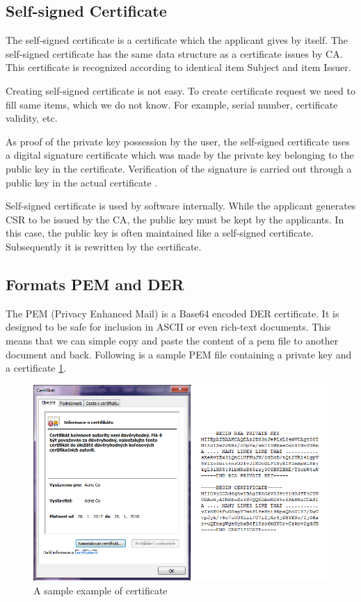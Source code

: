 \documentclass[
  digital, %
  notable,   %
  lof,     %
  lot,     %
]{fithesis3}
\begin{document}
\subsection{Self-signed Certificate}
The self-signed certificate is a certificate which the applicant gives by itself. The 
self-signed certificate has the same data structure as a certificate issues by CA. This 
certificate is recognized according to identical item Subject and item Issuer.

Creating self-signed certificate is not easy. To create certificate request we need to fill 
same items, which we do not know. For example, serial number, certificate validity, etc.

As proof of the private key possession by the user, the self-signed certificate uses a 
digital signature certificate which was made by the private key belonging to the public key 
in the certificate. Verification of the signature is carried out through a public key in the 
actual certificate \cite{dostalek2016velky}.

Self-signed certificate is used by software internally. While the applicant generates CSR to 
be issued by the CA, the public key must be kept by the applicants. In this case, the public 
key is often maintained like a self-signed certificate. Subsequently it is rewritten by the 
certificate.

\subsection{Formats PEM and DER}
The PEM (Privacy Enhanced Mail) is a Base64 encoded DER certificate. It is designed 
to be safe for inclusion in ASCII or even rich-text documents. This means that we can simple 
copy and paste the content of a pem file to another document and back. Following is a sample 
PEM file containing a private key and a certificate \ref{fig:vzorPEM-DER}.

\begin{figure}[th]
	\centering
	\includegraphics[width=1\textwidth]{pem-der}
	\caption{A sample example of certificate}
	\label{fig:vzorPEM-DER}
\end{figure}
\end{document}

